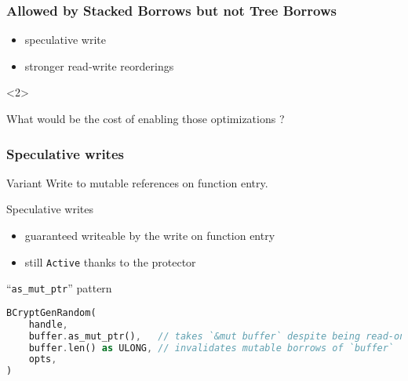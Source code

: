 
\begin{frame}
    \frametitle{Allowed by Stacked Borrows but not Tree Borrows}
    \begin{itemize}
        \item speculative write
        \item stronger read-write reorderings
    \end{itemize}

    \begin{onlyenv}<2>
        \begin{block}{}
            What would be the cost of enabling those optimizations ?
        \end{block}
    \end{onlyenv}
\end{frame}



\begin{frame}[fragile, t]
    \frametitle{Speculative writes}

    \begin{exampleblock}{Variant}
        Write to mutable references on function entry.
    \end{exampleblock}

    \begin{block}{{\cmark} Speculative writes}
        \begin{itemize}
            \item guaranteed writeable by the write on function entry
            \item still \texttt{Active} thanks to the protector
        \end{itemize}
    \end{block}

    \begin{block}{{\xmark} ``\texttt{as\_mut\_ptr}'' pattern}
        \begin{lstlisting}[language=rust, basicstyle=\ttfamily\scriptsize]
BCryptGenRandom(
    handle,
    buffer.as_mut_ptr(),   // takes `&mut buffer` despite being read-only
    buffer.len() as ULONG, // invalidates mutable borrows of `buffer`
    opts,
)
        \end{lstlisting}
    \end{block}
\end{frame}

